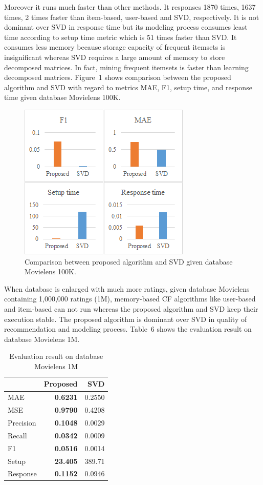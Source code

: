 \documentclass{sig-alternate}
\begin{document}
Moreover it runs much faster than other methods. It responses 1870 times, 1637 times, 2 times faster than item-based, user-based and SVD, respectively. It is not dominant over SVD in response time but its modeling process consumes least time according to setup time metric which is 51 times faster than SVD. It consumes less memory because storage capacity of frequent itemsets is insignificant whereas SVD requires a large amount of memory to store decomposed matrices. In fact, mining frequent itemsets is faster than learning decomposed matrices. Figure~1 shows comparison between the proposed algorithm and SVD with regard to metrics MAE, F1, setup time, and response time given database Movielens 100K.
\begin{figure} \label{figure:comparison100k}
\centering
\includegraphics{Comparison100K.png}
\caption{Comparison between proposed algorithm and SVD given database Movielens 100K.}
\label{figure:time100K}
\end{figure}

When database is enlarged with much more ratings, given database Movielens containing 1,000,000 ratings (1M), memory-based CF algorithms like user-based and item-based can not run whereas the proposed algorithm and SVD keep their execution stable. The proposed algorithm is dominant over SVD in quality of recommendation and modeling process. Table~6 shows the evaluation result on database Movielens 1M.
\begin{table} \label{table:evaluation.result.1M}
\setlength{\tabcolsep}{4pt}
\centering
\caption{Evaluation result on database Movielens 1M}
\begin{tabular}{|l|r|r|} \hline
&\textbf{Proposed}&SVD\\ \hline
MAE&\textbf{0.6231}&0.2550\\ \hline
MSE&\textbf{0.9790}&0.4208\\ \hline
Precision&\textbf{0.1048}&0.0029\\ \hline
Recall&\textbf{0.0342}&0.0009\\ \hline
F1&\textbf{0.0516}&0.0014\\ \hline
Setup&\textbf{23.405}&389.71\\ \hline
Response&\textbf{0.1152}&0.0946\\ \hline
\end{tabular}
\end{table}
\end{document}
